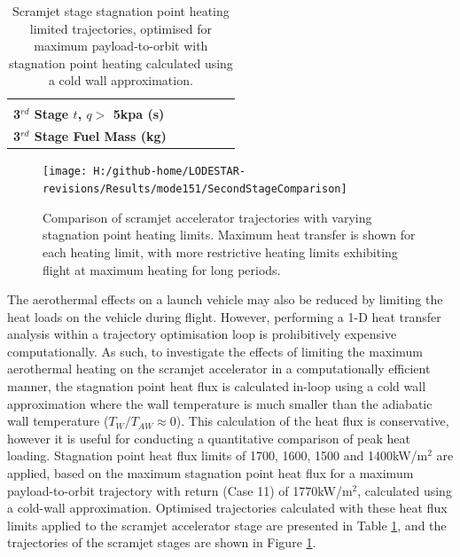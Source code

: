\begin{table}[ht]
\begin{tabular}{l c c c c c }
		& \textbf{\thirddExergyEffheatLimSeventeenHundred}
		& \textbf{\thirddExergyEffheatLimSixteenHundred}
		& \textbf{\thirddExergyEffheatLimFifteenHundred}
		& \textbf{\thirddExergyEffheatLimFourteenHundred}
		\\
		\textbf{3$^{rd}$ Stage $t$, $q >$ 5kpa (s)}
		& \thirdqOverFiveheatLimStandard
		& \thirdqOverFiveheatLimSeventeenHundred
		& \thirdqOverFiveheatLimSixteenHundred
		& \thirdqOverFiveheatLimFifteenHundred
		& \thirdqOverFiveheatLimFourteenHundred
		\\
		\textbf{3$^{rd}$ Stage Fuel Mass (kg)}
		& \thirdmFuelheatLimStandard
		& \thirdmFuelheatLimSeventeenHundred
		& \thirdmFuelheatLimSixteenHundred
		& \thirdmFuelheatLimFifteenHundred
		& \thirdmFuelheatLimFourteenHundred
		\\
		\hline 
	\end{tabular} 
	\caption{Scramjet stage stagnation point heating limited trajectories, optimised for maximum payload-to-orbit with stagnation point heating calculated using a cold wall approximation. }
	\label{tab:stagLim}
\end{table}
\begin{figure}[!ht]
	\centering
	\texttt{[image: H:/github-home/LODESTAR-revisions/Results/mode151/SecondStageComparison]}
	\caption{Comparison of scramjet accelerator trajectories with varying stagnation point heating limits. Maximum heat transfer is shown for each heating limit, with more restrictive heating limits exhibiting flight at maximum heating for long periods. }
	\label{fig:SecondStageheatlimComparison}
\end{figure}

\noindent
The aerothermal effects on a launch vehicle may also be reduced by limiting the heat loads on the vehicle during flight. However, performing a 1-D heat transfer analysis within a trajectory optimisation loop is prohibitively expensive computationally. 
As such, to investigate the effects of limiting the maximum aerothermal heating on the scramjet accelerator in a computationally efficient manner, the stagnation point heat flux is calculated in-loop using a cold wall approximation where the wall temperature is much smaller than the adiabatic wall temperature ($T_W/T_{AW} \approx 0$)\cite{Dirkx}. This calculation of the heat flux is conservative, however it is useful for conducting a quantitative comparison of peak heat loading. Stagnation point heat flux limits of 1700, 1600, 1500 and 1400kW/m$^2$ are applied, based on the maximum stagnation point heat flux for a maximum payload-to-orbit trajectory with return (Case 11) of 1770kW/m$^2$, calculated using a cold-wall approximation. Optimised trajectories calculated with these heat flux limits applied to the scramjet accelerator stage are presented in Table \ref{tab:stagLim}, and the trajectories of the scramjet stages are shown in Figure \ref{fig:SecondStageheatlimComparison}. 

